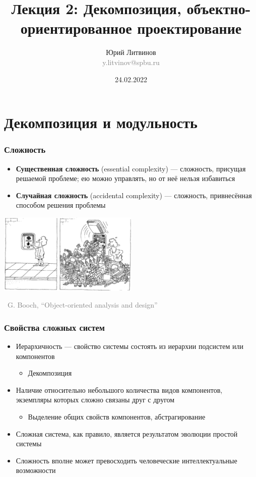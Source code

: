 \documentclass[xetex,mathserif,serif]{beamer}
\title[Декомпозиция, ООП]{Лекция 2: Декомпозиция, объектно-ориентированное проектирование}
\author[Юрий Литвинов]{Юрий Литвинов\\\small{\textcolor{gray}{y.litvinov@spbu.ru}}}
\date{24.02.2022}
\newcommand{\attribution}[1] {
    \begin{flushright}\begin{scriptsize}\textcolor{gray}{\textcopyright\, #1}\end{scriptsize}\end{flushright}
}
\begin{document}
    \frame{\titlepage}

    \section{Декомпозиция и модульность}

    \begin{frame}
        \frametitle{Сложность}
        \begin{itemize}
            \item \textbf{Существенная сложность} (essential complexity) --- сложность, присущая решаемой проблеме; ею можно управлять, но от неё нельзя избавиться
            \item \textbf{Случайная сложность} (accidental complexity) --- сложность, привнесённая способом решения проблемы
        \end{itemize}
        \vskip 0.5cm
        \begin{center}
            \includegraphics[width=0.5\textwidth]{complexityHiding.png}
        \end{center}
        \attribution{G. Booch, ``Object-oriented analysis and design''}
    \end{frame}

    \begin{frame}
        \frametitle{Свойства сложных систем}
        \begin{itemize}
            \item Иерархичность --- свойство системы состоять из иерархии подсистем или компонентов
            \begin{itemize}
                \item Декомпозиция
            \end{itemize}
            \item Наличие относительно небольшого количества видов компонентов, экземпляры которых сложно связаны друг с другом
            \begin{itemize}
                \item Выделение общих свойств компонентов, абстрагирование
            \end{itemize}
            \item Сложная система, как правило, является результатом эволюции простой системы
            \item Сложность вполне может превосходить человеческие интеллектуальные возможности
        \end{itemize}
    \end{frame}
\end{document}
